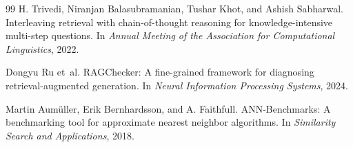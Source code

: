 \documentclass[10pt]{article}
\begin{document}
\begin{thebibliography}{99}
H. Trivedi, Niranjan Balasubramanian, Tushar Khot, and Ashish Sabharwal.
\newblock Interleaving retrieval with chain-of-thought reasoning for knowledge-intensive multi-step questions.
\newblock In \emph{Annual Meeting of the Association for Computational Linguistics}, 2022.

Dongyu Ru et~al.
\newblock RAGChecker: A fine-grained framework for diagnosing retrieval-augmented generation.
\newblock In \emph{Neural Information Processing Systems}, 2024.

Martin Aum\"uller, Erik Bernhardsson, and A. Faithfull.
\newblock ANN-Benchmarks: A benchmarking tool for approximate nearest neighbor algorithms.
\newblock In \emph{Similarity Search and Applications}, 2018.

\end{thebibliography}
\end{document}
